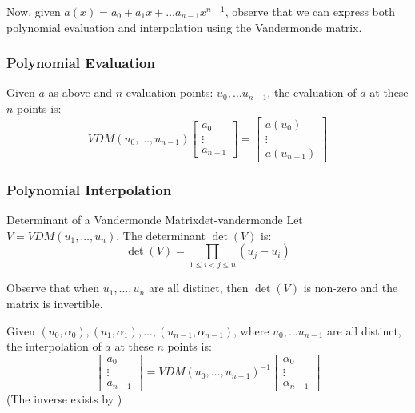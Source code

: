 Now, given $a(x) = a_0 + a_1x + \ldots a_{n-1}x^{n-1}$, observe that we can express both polynomial evaluation and interpolation using the Vandermonde matrix.

\subsubsection{Polynomial Evaluation}
Given $a$ as above and $n$ evaluation points: $u_0, \ldots u_{n - 1}$, the evaluation of $a$ at these $n$ points is:
\begin{equation}\label{eq:vandermonde-poly-eval}
    VDM(u_0, \ldots, u_{n-1})
    \begin{bmatrix}
        a_0 \\ \vdots \\ a_{n-1}
    \end{bmatrix}
    =
    \begin{bmatrix}
        a(u_0) \\ \vdots \\ a(u_{n-1})
    \end{bmatrix}
\end{equation}

\subsubsection{Polynomial Interpolation}
\begin{proposition}{Determinant of a Vandermonde Matrix}{det-vandermonde}
    Let $V = VDM(u_1, \ldots, u_n)$. The determinant $\det(V)$ is:
    \begin{equation}
        \det(V) = \prod_{1 \leq i < j \leq n} (u_j - u_i)
    \end{equation}
\end{proposition}
\begin{remark}
    Observe that when $u_1, \ldots, u_n$ are all distinct, then $\det(V)$ is non-zero and the matrix is invertible.
\end{remark}
Given $(u_0, \alpha_0), (u_1, \alpha_1), \ldots, (u_{n-1}, \alpha_{n-1})$, where $u_0, \ldots u_{n-1}$ are all distinct, the interpolation of $a$ at these $n$ points is:
\begin{equation}\label{eq:vandermonde-poly-interp}
    \begin{bmatrix}
        a_0 \\ \vdots \\ a_{n-1}
    \end{bmatrix}
    =
    VDM(u_0, \ldots, u_{n-1})^{-1}
    \begin{bmatrix}
        \alpha_0 \\ \vdots \\ \alpha_{n-1}
    \end{bmatrix}
\end{equation}
(The inverse exists by )


